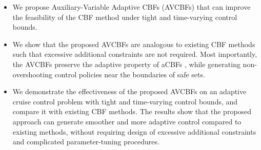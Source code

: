\begin{itemize}
\item We propose Auxiliary-Variable Adaptive CBFs (AVCBFs) that can improve the feasibility of the CBF method under tight and time-varying control bounds.

\item We show that the proposed AVCBFs are analogous to existing CBF methods such that excessive additional constraints are not required. Most importantly, the AVCBFs preserve the adaptive property of aCBFs \cite{xiao2021adaptive}, while generating non-overshooting control policies near the boundaries of safe sets.


\item We demonstrate the effectiveness of the proposed AVCBFs on an adaptive cruise control problem with tight and time-varying control bounds, and compare it with existing CBF methods. The results show that the proposed approach can generate smoother and more adaptive control compared to existing methods, without requiring design of excessive additional constraints and complicated parameter-tuning procedures.
\end{itemize}
